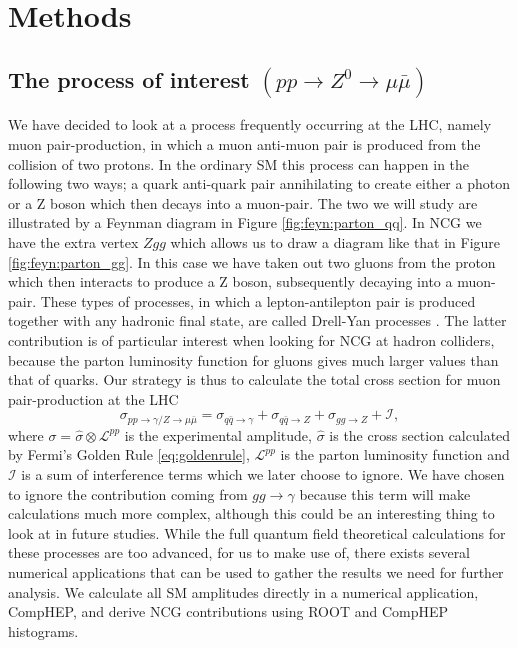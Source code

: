\section{Methods}

\subsection{The process of interest $(pp \rightarrow Z^0 \rightarrow \mu \bar\mu)$}
We have decided to look at a process frequently occurring at the LHC, namely muon pair-production, in which a muon anti-muon pair is produced from the collision of two protons. In the ordinary SM this process can happen in the following two ways; a quark anti-quark pair annihilating to create either a photon or a Z boson which then decays into a muon-pair. The two we will study are illustrated by a Feynman diagram in Figure \ref{fig:feyn:parton_qq}. In NCG we have the extra vertex $Zgg$ which allows us to draw a diagram like that in Figure \ref{fig:feyn:parton_gg}. In this case we have taken out two gluons from the proton which then interacts to produce a Z boson, subsequently decaying into a muon-pair. These types of processes, in which a lepton-antilepton pair is produced together with any hadronic final state, are called Drell-Yan processes \cite{burgess2007smp}. The latter contribution is of particular interest when looking for NCG at hadron colliders, because the parton luminosity function for gluons gives much larger values than that of quarks. Our strategy is thus to calculate the total cross section for muon pair-production at the LHC
\begin{equation}
	\sigma_{pp \rightarrow \gamma/ Z \rightarrow \mu \bar \mu} = \sigma_{q \bar q \rightarrow \gamma} + \sigma_{q \bar q \rightarrow Z} + \sigma_{gg \rightarrow Z} + \mathcal{I},
\end{equation}
where $\sigma =\hat \sigma \otimes \mathcal{L}^{pp}$ is the experimental amplitude, $\hat \sigma$ is the cross section calculated by Fermi's Golden Rule \eqref{eq:goldenrule}, $\mathcal{L}^{pp}$ is the parton luminosity function and $\mathcal{I}$ is a sum of interference terms which we later choose to ignore. We have chosen to ignore the contribution coming from $gg \rightarrow \gamma$ because this term will make calculations much more complex, although this could be an interesting thing to look at in future studies. While the full quantum field theoretical calculations for these processes are too advanced, for us to make use of, there exists several numerical applications that can be used to gather the results we need for further analysis. We calculate all SM amplitudes directly in a numerical application, CompHEP, and derive NCG contributions using ROOT and CompHEP histograms.

